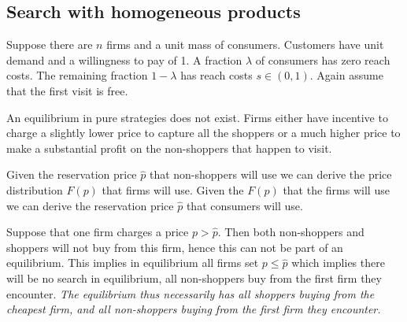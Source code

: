 \subsection{Search with homogeneous products}
Suppose there are $n$ firms and a unit mass of consumers. Customers have
unit demand and a willingness to pay of 1. A fraction $\lambda$ of
consumers has zero reach costs. The remaining fraction $1-\lambda$ has
reach costs $s\in(0,1)$. Again assume that the first visit is free.

An equilibrium in pure strategies does not exist. Firms either have
incentive to charge a slightly lower price to capture all
the shoppers or a much higher price to make a substantial profit on the
non-shoppers that happen to visit.

Given the reservation price $\hat p$ that non-shoppers will use we can
derive the price distribution $F(p)$ that firms will use.
Given the $F(p)$ that the firms will use we can derive the reservation
price $\hat p$ that consumers will use.

Suppose that one firm charges a price $p>\hat p$. Then both non-shoppers
and shoppers will not buy from this firm, hence this can not be part
of an equilibrium. This implies in equilibrium all firms set $p\leq\hat p$
which implies there will be no search in equilibrium, all non-shoppers
buy from the first firm they encounter. \textit{The equilibrium thus
	necessarily has all shoppers buying from the cheapest firm, and
	all non-shoppers buying from the first firm they encounter.}
